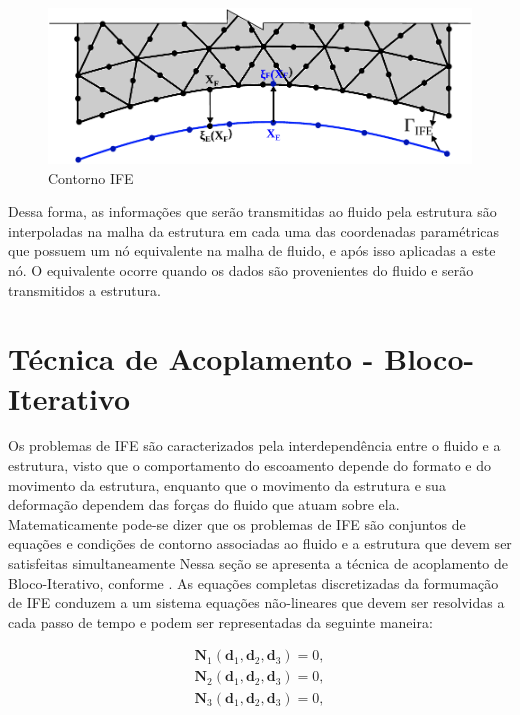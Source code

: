 \documentclass[tese_patricia]{subfiles}
\begin{document}
\begin{figure}[htb!]
	\centering 
	\includegraphics[scale=0.9,trim=0cm 0cm 0cm 0cm, clip=true]{Imagens/Cap7/contornoIFE.pdf}	
	\caption{Contorno IFE}
	\label{fig:contornoIFE}
\end{figure}

Dessa forma, as informações que serão transmitidas ao fluido pela estrutura são interpoladas na malha da estrutura em cada uma das coordenadas paramétricas que possuem um nó equivalente na malha de fluido, e após isso aplicadas a este nó. O equivalente ocorre quando os dados são provenientes do fluido e serão transmitidos a estrutura.


\section{Técnica de Acoplamento - Bloco-Iterativo}

Os problemas de IFE são caracterizados pela interdependência entre o fluido e a estrutura, visto que o comportamento do escoamento depende do formato e do movimento da estrutura, enquanto que o movimento da estrutura e sua deformação dependem das forças do fluido que atuam sobre ela. Matematicamente pode-se dizer que os problemas de IFE são conjuntos de equações e condições de contorno associadas ao fluido e a estrutura que devem ser satisfeitas simultaneamente
Nessa seção se apresenta a técnica de acoplamento de Bloco-Iterativo, conforme . As equações completas discretizadas da formumação de IFE conduzem a um sistema equações não-lineares que devem ser resolvidas a cada passo de tempo e podem ser representadas da seguinte maneira:

\begin{align}
	\mathbf{N}_{1}\left(\mathbf{d}_{1},\mathbf{d}_{2},\mathbf{d}_{3}\right) = 0,\\
	\mathbf{N}_{2}\left(\mathbf{d}_{1},\mathbf{d}_{2},\mathbf{d}_{3}\right) = 0,\\
	\mathbf{N}_{3}\left(\mathbf{d}_{1},\mathbf{d}_{2},\mathbf{d}_{3}\right) = 0,
\end{align}
\end{document}
